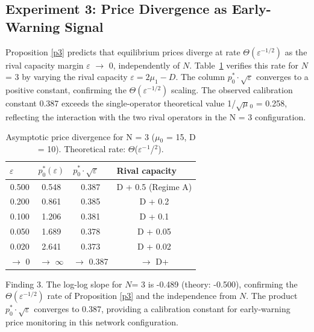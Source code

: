 \documentclass[review,3p,authoryear]{elsarticle}
\begin{document}
\subsection{Experiment 3: Price Divergence as Early-Warning Signal}
\label{sec6.3}

Proposition \ref{p3} predicts that equilibrium prices diverge at rate ${\Theta}({\varepsilon}^{-1/2})$ as the rival capacity margin \ensuremath{\varepsilon} \ensuremath{\to} 0, independently of $N$. Table~\ref{tab3} verifies this rate for $N$= 3 by varying the rival capacity ${\varepsilon}=2{\mu}_{1} - D$. The column $p_{0}^{*} {\cdot} \sqrt{\varepsilon}$ converges to a positive constant, confirming the ${\Theta}({\varepsilon}^{-1/2})$ scaling. The observed calibration constant 0.387 exceeds the single-operator theoretical value 1/\ensuremath{\sqrt{\ensuremath{\mu}}}\ensuremath{_{0}} = 0.258, reflecting the interaction with the two rival operators in the N = 3 configuration.

\begin{table}[!ht]
\centering
\caption{Asymptotic price divergence for N = 3 (\ensuremath{\mu}\ensuremath{_{0}} = 15, D = 10). Theoretical rate: \ensuremath{\Theta}(\ensuremath{\varepsilon}\ensuremath{^{-}}\ensuremath{^{1}}/\ensuremath{^{2}}).}
\label{tab3}
\begin{tabular}{@{}cccc@{}}
\toprule
\multicolumn{1}{l}{\textbf{$\varepsilon$}} & \multicolumn{1}{l}{\textbf{$p_{0}^{*}(\varepsilon)$}} & \multicolumn{1}{l}{\textbf{$p_{0}^{*} \cdot \sqrt{\varepsilon}$}} & \multicolumn{1}{l}{\textbf{Rival capacity}} \\ \midrule
0.500 & 0.548 & 0.387 & D + 0.5 (Regime A) \\
0.200 & 0.861 & 0.385 & D + 0.2 \\
0.100 & 1.206 & 0.381 & D + 0.1 \\
0.050 & 1.689 & 0.378 & D + 0.05 \\
0.020 & 2.641 & 0.373 & D + 0.02 \\
$\to$ 0 & $\to$ $\infty$ & $\to$ 0.387 & $\to$ D+ \\ \bottomrule
\end{tabular}
\end{table}

Finding 3. The log-log slope for $N$= 3 is -0.489 (theory: -0.500), confirming the ${\Theta}({\varepsilon}^{-1/2})$ rate of Proposition \ref{p3} and the independence from $N$. The product $p_{0}^{*} {\cdot} \sqrt{\varepsilon}$ converges to 0.387, providing a calibration constant for early-warning price monitoring in this network configuration.
\end{document}
